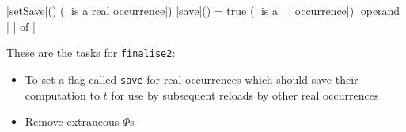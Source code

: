 \documentclass[a4paper,12pt, notitlepage]{article}
\begin{document}
\begin{program}
\PROC |setSave|(\psi) \BODY
    \IF (\psi | is a real occurrence|) \AR*
        |save|(\psi) = true
    \ELSIF (\psi | is a | \Phi | occurrence|) \AR*
        \FOREACH |operand | \omega | of | \psi \DO
            
\end{program}

These are the tasks for \texttt{finalise2}:
\begin{itemize}
\item To set a flag called \texttt{save} for real occurrences which should save
their computation to $t$ for use by subsequent reloads by other real
occurrences
\item Remove extraneous $\Phi$s
\end{itemize}

\end{document}
